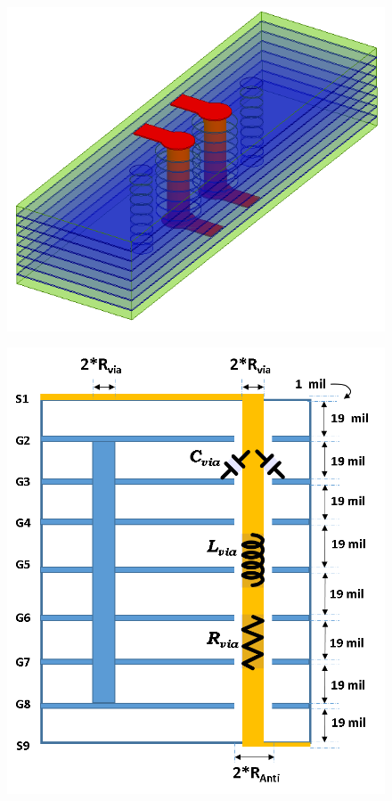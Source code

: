\documentclass{book}  %
\begin{document}
\begin{paper}
\begin{figure}[htbp!]
	\centering	
	\begin{minipage}[b]{0.5\linewidth}
		\includegraphics[width=\textwidth]{./img/PCB/Via_Transition/Q3D_tuned_side.png}
		\label{fig:pcb_via_tran_Q3D}
	\end{minipage}%
	\begin{minipage}[b]{0.5\linewidth}
		\includegraphics[width=\textwidth]{./img/PCB/Via_Transition/Via_transition_LC_modeling.png}

\end{minipage}
\end{figure}
\end{paper}
\end{document}
